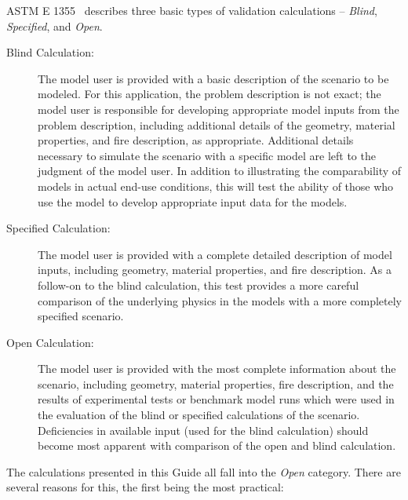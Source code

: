 ASTM E 1355~\cite{ASTM:E1355} describes three basic types of validation calculations -- {\em Blind}, {\em Specified}, and {\em Open}.
\begin{description}
\item [Blind Calculation:] The model user is provided with a basic description of the scenario to be modeled. For this application, the problem description is not exact; the model user is responsible for developing appropriate model inputs from the problem description, including additional details of the geometry, material properties, and fire description, as appropriate. Additional details necessary to simulate the scenario with a specific model are left to the judgment of the model user. In addition to illustrating the comparability of models in actual end-use conditions, this will test the ability of those who use the model to develop appropriate input data for the models.
\item [Specified Calculation:] The model user is provided with a complete detailed description of model inputs, including geometry, material properties, and fire description. As a follow-on to the blind calculation, this test provides a more careful comparison of the underlying physics in the models with a more completely specified scenario.
\item [Open Calculation:] The model user is provided with the most complete information about the scenario, including geometry, material properties, fire description, and the results of experimental tests or benchmark model runs which were used in the evaluation of the blind or specified calculations of the scenario. Deficiencies in available input (used for the blind calculation) should become most apparent with comparison of the open and blind calculation.
\end{description}
The calculations presented in this Guide all fall into the {\em Open} category. There are several reasons for this, the first being the most practical:
